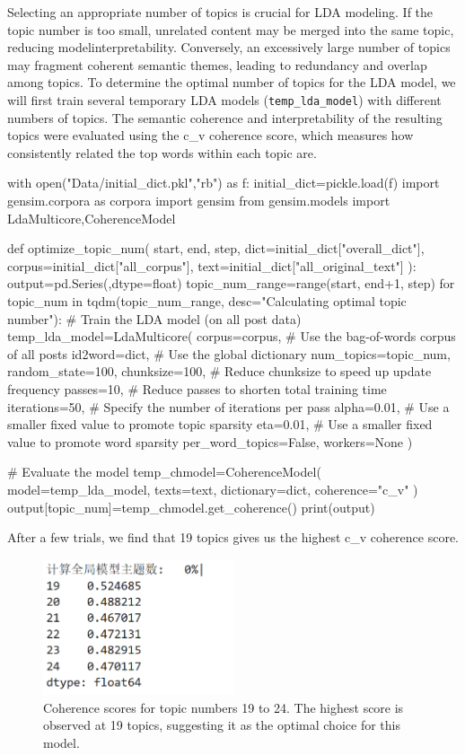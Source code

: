 \documentclass[12pt]{article}
\numberwithin{figure}{section}  %
\begin{document}
	Selecting an appropriate number of topics is crucial for LDA modeling. If
	the topic number is too small, unrelated content may be merged into the same
	topic, reducing modelinterpretability. Conversely, an excessively large number of
	topics may fragment coherent semantic themes, leading to redundancy and
	overlap among topics. To determine the optimal number of topics for the LDA
	model, we will first train several temporary LDA models (\texttt{temp\_lda\_model}) with different
	numbers of topics. The semantic coherence and interpretability of the
	resulting topics were evaluated using the c\_v coherence score, which
	measures how consistently related the top words within each topic are. 
	\begin{python}
with open("Data/initial_dict.pkl","rb") as f:
    initial_dict=pickle.load(f)
import gensim.corpora as corpora
import gensim
from gensim.models import LdaMulticore,CoherenceModel

def optimize_topic_num(
  start,
  end,
  step,
  dict=initial_dict["overall_dict"],
  corpus=initial_dict["all_corpus"],
  text=initial_dict["all_original_text"]      
):
  output=pd.Series({},dtype=float)
  topic_num_range=range(start, end+1, step)
  for topic_num in tqdm(topic_num_range, desc="Calculating optimal topic number"):
    # Train the LDA model (on all post data)
    temp_lda_model=LdaMulticore(
        corpus=corpus,    # Use the bag-of-words corpus of all posts
        id2word=dict,     # Use the global dictionary
        num_topics=topic_num,
        random_state=100,
        chunksize=100,    # Reduce chunksize to speed up update frequency
        passes=10,        # Reduce passes to shorten total training time
        iterations=50,    # Specify the number of iterations per pass
        alpha=0.01,       # Use a smaller fixed value to promote topic sparsity
        eta=0.01,         # Use a smaller fixed value to promote word sparsity
        per_word_topics=False,  
        workers=None                    
    )

    # Evaluate the model 
    temp_chmodel=CoherenceModel(
        model=temp_lda_model,
        texts=text,
        dictionary=dict,
        coherence="c_v"
    )
    output[topic_num]=temp_chmodel.get_coherence()
  print(output)
	\end{python}
	
	After a few trials, we find that 19 topics gives us the highest c\_v
	coherence score. 
	\begin{figure}[H]
		\centering
		\includegraphics[width=0.5\textwidth]{Q2CV1} 
		\caption{\centering Coherence scores for topic numbers 19 to 24. The highest score is observed at 19 topics, suggesting it as the optimal choice for this model.}		
	\end{figure}
	
\end{document}
